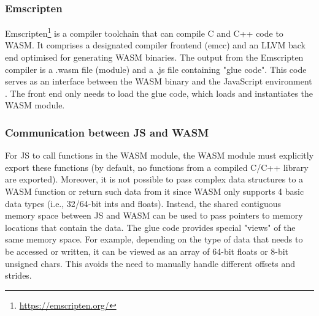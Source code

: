 \documentclass{l4proj}
\begin{document}
\subsubsection{Emscripten}
\label{sec:emscripten}
Emscripten\footnote{\url{https://emscripten.org/}} is a compiler toolchain that can compile C and C++ code to WASM. It comprises a designated compiler frontend (emcc) and an LLVM back end optimised for generating WASM binaries.
The output from the Emscripten compiler is a .wasm file (module) and a .js file containing "glue code". This code serves as an interface between the WASM binary and the JavaScript environment \citep{Emscripten_tutorial}. The front end only needs to load the glue code, which loads and instantiates the WASM module.

\subsubsection{Communication between JS and WASM}
\label{sec:js_wasm_communication}
For JS to call functions in the WASM module, the WASM module must explicitly export these functions (by default, no functions from a compiled C/C++ library are exported).
Moreover, it is not possible to pass complex data structures to a WASM function or return such data from it since WASM only supports 4 basic data types (i.e., 32/64-bit ints and floats).
Instead, the shared contiguous memory space between JS and WASM can be used to pass pointers to memory locations that contain the data.
The glue code provides special "views" of the same memory space. For example, depending on the type of data that needs to be accessed or written, it can be viewed as an array of 64-bit floats or 8-bit unsigned chars.
This avoids the need to manually handle different offsets and strides.
\end{document}
